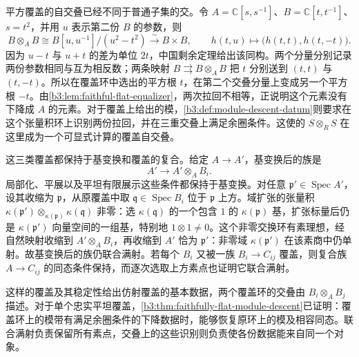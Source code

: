 \ProseParagraphBreak
平方覆盖的自交叠已经不同于普通子集的交。令 \(A=\mathbb C[s,s^{-1}]\)、\(B=\mathbb C[t,t^{-1}]\)、\(s=t^2\)，并用 \(u\) 表示第二份 \(B\) 的参数，则
\[
	B\otimes_AB\cong B[u,u^{-1}]/(u^2-t^2) \xrightarrow{\sim}B\times B, \qquad h(t,u)\longmapsto\bigl(h(t,t),h(t,-t)\bigr).
\]
因为 \(u-t\) 与 \(u+t\) 的差为单位 \(2t\)，中国剩余定理给出该同构。两个分量分别记录两份参数相同与互为相反数；两条映射 \(B\rightrightarrows B\otimes_AB\) 把 \(t\) 分别送到 \((t,t)\) 与 \((t,-t)\)。所以在覆盖环中选出的平方根 \(t\)，在第二个交叠分量上变成另一个平方根 \(-t\)。由\cref{b3:lem:faithful-flat-equalizer}，两次拉回不相等，正说明这个元素没有下降成 \(A\) 的元素。对于覆盖上给出的模，\cref{b3:def:module-descent-datum}则要求在这个张量积环上识别两份拉回，并在三重交叠上满足余圈条件。这使的 \(S\otimes_RS\) 在这里成为一个可显式计算的覆盖自交叠。

\ProseParagraphBreak
这三类覆盖都保持于基变换和覆盖的复合。给定 \(A\rightarrow A'\)，基变换后的族是
\[
	A'\longrightarrow A'\otimes_AB_i.
\]
局部化、平展以及平坦有限展示这些条件都保持于基变换。对任意 \(\mathfrak p'\in\operatorname{Spec}A'\)，设其收缩为 \(\mathfrak p\)，从原覆盖中取 \(\mathfrak q\in\operatorname{Spec}B_i\) 位于 \(\mathfrak p\) 上方。域扩张的张量积 \(\kappa(\mathfrak p')\otimes_{\kappa(\mathfrak p)}\kappa(\mathfrak q)\) 非零：选 \(\kappa(\mathfrak q)\) 的一个包含 \(1\) 的 \(\kappa(\mathfrak p)\) 基，扩张标量后仍是 \(\kappa(\mathfrak p')\) 向量空间的一组基，特别地 \(1\otimes1\ne0\)。这个非零交换环有素理想，经自然映射收缩到 \(A'\otimes_AB_i\)，再收缩到 \(A'\) 恰为 \(\mathfrak p'\)：非零域 \(\kappa(\mathfrak p')\) 在该素商中仍单射。故基变换后的族仍联合满射。若每个 \(B_i\) 又被一族 \(B_i\rightarrow C_{ij}\) 覆盖，则复合族 \(A\rightarrow C_{ij}\) 的同态条件保持，而逐次选取上方素点也证明它联合满射。

\ProseParagraphBreak
这样的覆盖及其稳定性给出仿射覆盖的基本数据，两个覆盖环的交叠由 \(B_i\otimes_AB_j\) 描述。对于单个忠实平坦覆盖，\cref{b3:thm:faithfully-flat-module-descent}已证明：覆盖环上的模带有满足余圈条件的下降数据时，能够恢复原环上的模及相容同态。联合满射负责保留所有素点，交叠上的这些识别则负责使各份数据能来自同一个对象。
